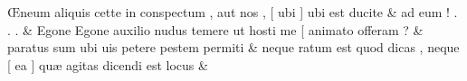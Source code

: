 \documentclass[12pt,onecolumn,twoside,a4paper]{memoir}
\begin{document}
               \begin{pairs}
                  \begin{Leftside}
			\beginnumbering
			\setcounter{stanzaL}{0}
                     
                         \stanza {}
                              Œneum
                              aliquis
                              cette
                              in
                              conspectum
                              ,
                              aut
                              nos
                              ,
                              [
                              ubi
                              ]
                              ubi
                              est
                              ducite & 
                     ad
                              eum
                              !
                              .
                              .
                              . \&
                         \stanza {}
                     Egone
                              {Egone}
                              auxilio
                              nudus
                              temere
                              ut
                              hosti
                              me
                              [
                              animato
                              offeram
                              ? \&
                         \stanza {}
                     paratus
                              sum
                              ubi
                              uis
                              petere
                              pestem
                              permiti \&
                         \stanza {}
                     neque
                              ratum
                              est
                              quod
                              dicas
                              ,
                              neque
                              [
                              ea
                              ]
                              quæ
                              agitas
                              dicendi
                              est
                              locus \&
                         \stanza {}
                     

\end{Leftside}
\end{pairs}
\end{document}
